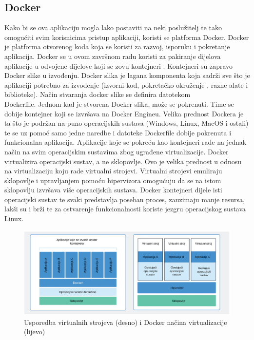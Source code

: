 \documentclass[times, utf8, zavrsni]{fer}
\begin{document}
\subsection{Docker}
Kako bi se ova aplikaciju mogla lako postaviti  na neki poslužitelj te tako omogućiti svim korisnicima pristup aplikaciji,
koristi se platforma Docker. Docker je platforma otvorenog koda koja se koristi za razvoj, isporuku i pokretanje aplikacija.
Docker se u ovom završnom radu koristi za pakiranje dijelova aplikacije u odvojene dijelove koji se zovu kontejneri .
Kontejneri su zapravo Docker slike  u izvođenju. Docker slika je lagana  komponenta koja sadrži sve što je aplikaciji 
potrebno za izvođenje (izvorni kod, pokretačko okruženje , razne alate i biblioteke). Način stvaranja docker slike se definira 
datotekom \\Dockerfile. Jednom kad je stvorena Docker slika, može se pokrenuti. Time se dobije kontejner koji se izvršava na Docker Engineu. 
Velika prednost Dockera je ta što je podržan na puno operacijskih sustava (Windows, Linux, MacOS i ostali) te se uz pomoć samo jedne naredbe i datoteke Dockerfile
dobije pokrenuta i funkcionalna aplikacija. Aplikacije koje se pokreću kao kontejneri rade na jednak način na svim operacijskim sustavima zbog ugrađene virtualizacije.
Docker virtualizira operacijski sustav, a ne sklopovlje. Ovo je velika prednost u odnosu na virtualizaciju koju rade virtualni strojevi. 
Virtualni strojevi emuliraju sklopovlje i upravljanjem pomoću hipervizora omogućuju da se na istom sklopovlju izvršava više operacijskih sustava. 
Docker kontejneri dijele isti operacijski sustav te svaki predstavlja poseban proces, zauzimaju manje 
resursa, lakši su i brži te za ostvarenje funkcionalnosti koriste jezgru operacijskog sustava Linux.

\begin{figure}[htb]
    \hspace*{-1cm}
    \includegraphics[scale=0.36]{slika2.png}
    \caption{Usporedba virtualnih strojeva (desno) i Docker načina virtualizacije (lijevo)}
    \label{fig:docker}
    \end{figure}
\end{document}
